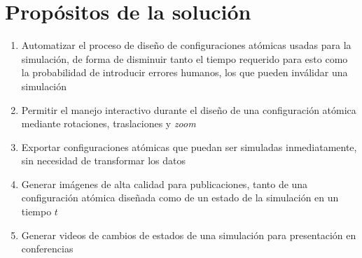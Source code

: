 



\section{Propósitos de la solución}
\begin{enumerate}
  \item Automatizar el proceso de diseño de configuraciones atómicas usadas para la simulación, de forma de disminuir tanto el tiempo requerido para esto como la probabilidad de introducir errores humanos, los que pueden inválidar una simulación
  \item Permitir el manejo interactivo durante el diseño de una configuración atómica mediante rotaciones, traslaciones y \emph{zoom}
  \item Exportar configuraciones atómicas que puedan ser simuladas inmediatamente, sin necesidad de transformar los datos
  \item Generar imágenes de alta calidad para publicaciones, tanto de una configuración atómica diseñada como de un estado de la simulación en un tiempo $t$
  \item Generar videos de cambios de estados de una simulación para presentación en conferencias
\end{enumerate}


